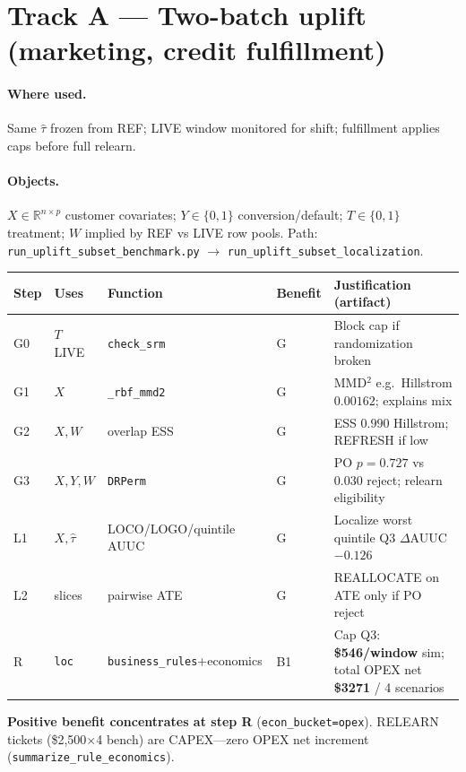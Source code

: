 \documentclass[11pt]{article}
\newcommand{\bene}{\cellcolor{benefit}}
\newcommand{\gate}{\cellcolor{gate}}
\begin{document}
\section{Track A --- Two-batch uplift (marketing, credit fulfillment)}
\paragraph{Where used.}
Same $\hat\tau$ frozen from REF; LIVE window monitored for shift; fulfillment applies caps before full relearn.

\paragraph{Objects.}
$X\in\mathbb{R}^{n\times p}$ customer covariates; $Y\in\{0,1\}$ conversion/default; $T\in\{0,1\}$ treatment; $W$ implied by REF vs LIVE row pools.
Path: \texttt{run\_uplift\_subset\_benchmark.py} $\rightarrow$ \texttt{run\_uplift\_subset\_localization}.

\begin{longtable}{@{}p{}p{}p{}p{}p{}@{}}
\toprule
Step & Uses & Function & Benefit & Justification (artifact) \\
\midrule
\endhead
G0 & $T$ LIVE & \texttt{check\_srm} & \gate G & Block cap if randomization broken \\
G1 & $X$ & \texttt{\_rbf\_mmd2} & \gate G & MMD$^2$ e.g.\ Hillstrom $0.00162$; explains mix \\
G2 & $X,W$ & overlap ESS & \gate G & ESS $0.990$ Hillstrom; REFRESH if low \\
G3 & $X,Y,W$ & \texttt{DRPerm} & \gate G & PO $p{=}0.727$ vs $0.030$ reject; relearn eligibility \\
L1 & $X,\hat\tau$ & LOCO/LOGO/quintile AUUC & \gate G & Localize worst quintile Q3 $\Delta$AUUC $-0.126$ \\
L2 & slices & pairwise ATE & \gate G & REALLOCATE on ATE only if PO reject \\
R & \texttt{loc} & \texttt{business\_rules}+economics & \bene B1 & Cap Q3: \textbf{\$546/window} sim; total OPEX net \textbf{\$3271} / 4 scenarios \\
\bottomrule
\end{longtable}

\noindent\textbf{Positive benefit concentrates at step R} (\texttt{econ\_bucket=opex}).
RELEARN tickets (\$2{,}500$\times$4 bench) are CAPEX---zero OPEX net increment (\texttt{summarize\_rule\_economics}).
\end{document}
